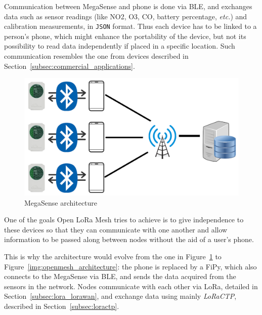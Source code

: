 		Communication between MegaSense and phone is done via BLE, and exchanges data such as sensor readings (like NO2,
		O3, CO, battery percentage, \textit{etc.}) and calibration measurements, in \texttt{JSON} format.
		Thus each device has to be linked to a person's phone, which might enhance the portability of the device, but not its possibility to read data independently if placed in a specific location.
		Such communication resembles the one from devices described in Section~\ref{subsec:commercial_applications}.
		
		\begin{figure}[h]
			\centering
			\includegraphics[width=.75\textwidth]{resources/img/chap5/architecture_megasense}
			\caption{MegaSense architecture}
			\label{img:megasense_architecture}
		\end{figure}
	
		One of the goals Open LoRa Mesh tries to achieve is to give independence to these devices so that they can communicate with one another and allow information to be passed along between nodes without the aid of a user's phone.
	
		This is why the architecture would evolve from the one in Figure~\ref{img:megasense_architecture} to Figure~\ref{img:openmesh_architecture}: the phone is replaced by a FiPy, which also connects to the MegaSense via BLE, and sends the data acquired from the sensors in the network.
		Nodes communicate with each other via LoRa, detailed in Section~\ref{subsec:lora_lorawan}, and exchange data using mainly \textit{LoRaCTP}, described in Section~\ref{subsec:loractp}.
		
